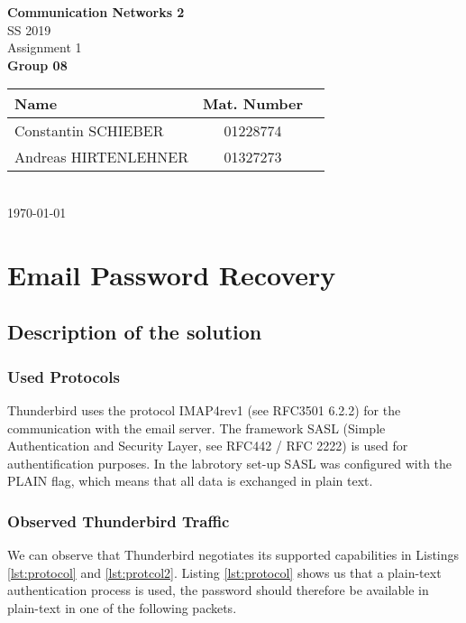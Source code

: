 \documentclass[parskip=full]{scrartcl}
\begin{document}
\begin{titlepage}
    \centering
    \vspace*{2cm}
    {\Huge \textbf{Communication Networks 2}}\\
    SS 2019\\
    \vspace*{1cm}
    {\Large Assignment 1}
    \\\vspace*{3cm}
    {\Large \textbf{Group 08}}\\
    \vspace*{1cm}
    {\large 
        \begin{tabular}{l c c}
            Name & Mat. Number \\ \hline
            Constantin SCHIEBER & 01228774 \\
            Andreas HIRTENLEHNER & 01327273
        \end{tabular}
    }
    \\\vspace*{7cm}
    \today
\end{titlepage}

\section{Email Password Recovery}

\subsection{Description of the solution}

\subsubsection{Used Protocols}
Thunderbird uses the protocol IMAP4rev1 (see RFC3501 6.2.2) for the communication with the email server.
The framework SASL (Simple Authentication and Security Layer, see RFC442 / RFC 2222) is used for authentification purposes.
In the labrotory set-up SASL was configured with the PLAIN flag, which means that all data is exchanged in plain text.

\subsubsection{Observed Thunderbird Traffic}
We can observe that Thunderbird negotiates its supported capabilities in Listings \ref{lst:protocol} and \ref{lst:protcol2}.
Listing \ref{lst:protocol} shows us that a plain-text authentication process is used, the password should therefore be available in plain-text in one of the following packets.
\end{document}
